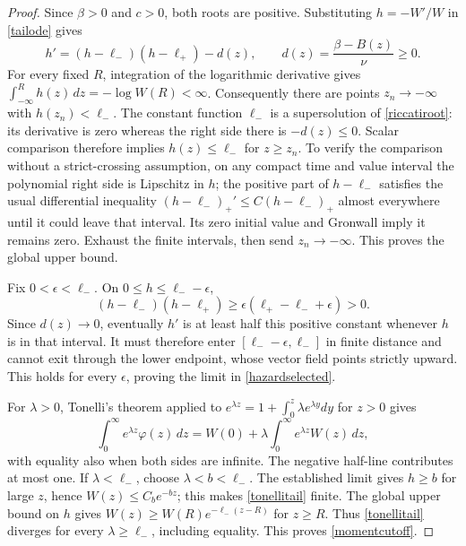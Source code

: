 \documentclass[11pt]{article}
\begin{document}
\begin{proof}
Since $\beta>0$ and $c>0$, both roots are positive. Substituting
$h=-W'/W$ in \eqref{tailode} gives
\begin{equation}\label{riccatiroot}
 h'=(h-\ell_-)(h-\ell_+)-d(z),\qquad
 d(z)=\frac{\beta-B(z)}\nu\geq0.
\end{equation}
For every fixed $R$, integration of the logarithmic derivative gives
$\int_{-\infty}^R h(z)\,dz=-\log W(R)<\infty$.
Consequently there are points $z_n\to-\infty$ with
$h(z_n)<\ell_-$. The constant function $\ell_-$ is a supersolution
of \eqref{riccatiroot}: its derivative is zero whereas the right side
there is $-d(z)\leq0$. Scalar comparison therefore implies
$h(z)\leq\ell_-$ for $z\geq z_n$. To verify the comparison without
a strict-crossing assumption, on any compact time and value interval
the polynomial right side is Lipschitz in $h$; the positive part of
$h-\ell_-$ satisfies the usual differential inequality
$(h-\ell_-)_{+}'\leq C(h-\ell_-)_{+}$ almost everywhere until it
could leave that interval. Its zero initial value and Gronwall imply
it remains zero. Exhaust the finite intervals, then send $z_n\to-\infty$.
This proves the global upper bound.

Fix $0<\epsilon<\ell_-$. On $0\leq h\leq\ell_--\epsilon$,
\[
 (h-\ell_-)(h-\ell_+)
 \geq\epsilon(\ell_+-\ell_-+\epsilon)>0.
\]
Since $d(z)\to0$, eventually $h'$ is at least half this positive
constant whenever $h$ is in that interval. It must therefore enter
$[\ell_--\epsilon,\ell_-]$ in finite distance and cannot exit through
the lower endpoint, whose vector field points strictly upward.
This holds for every $\epsilon$, proving the limit in
\eqref{hazardselected}.

For $\lambda>0$, Tonelli's theorem applied to
$e^{\lambda z}=1+\int_0^z\lambda e^{\lambda y}dy$ for $z>0$ gives
\begin{equation}\label{tonellitail}
 \int_0^\infty e^{\lambda z}\varphi(z)\,dz
    =W(0)+\lambda\int_0^\infty e^{\lambda z}W(z)\,dz,
\end{equation}
with equality also when both sides are infinite. The negative half-line
contributes at most one. If $\lambda<\ell_-$, choose
$\lambda<b<\ell_-$. The established limit gives $h\geq b$ for
large $z$, hence $W(z)\leq C_b e^{-bz}$; this makes
\eqref{tonellitail} finite. The global upper bound on $h$ gives
$W(z)\geq W(R)e^{-\ell_-(z-R)}$ for $z\geq R$.
Thus \eqref{tonellitail} diverges for every $\lambda\geq\ell_-$,
including equality. This proves \eqref{momentcutoff}.


\end{proof}
\end{document}
